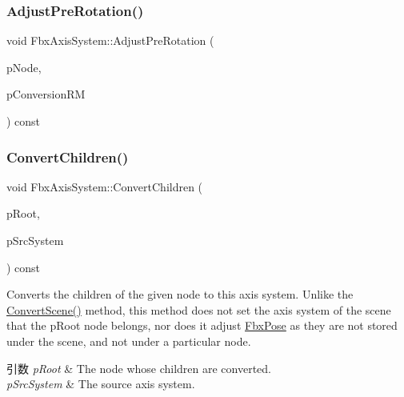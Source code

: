 \mbox{\label{class_fbx_axis_system_af7afdf5273c5ca9130ee8996f6f846a3}} 
\subsubsection{\texorpdfstring{Adjust\+Pre\+Rotation()}{AdjustPreRotation()}}
{\footnotesize\ttfamily void Fbx\+Axis\+System\+::\+Adjust\+Pre\+Rotation (\begin{DoxyParamCaption}\item[{\hyperlink{class_fbx_node}{Fbx\+Node} $\ast$}]{p\+Node,  }\item[{const \hyperlink{class_fbx_matrix}{Fbx\+Matrix} \&}]{p\+Conversion\+RM }\end{DoxyParamCaption}) const\hspace{0.3cm}{\ttfamily [protected]}}

\mbox{\label{class_fbx_axis_system_a3eff3d4a3b2270a5f3675f32b698e6e9}} 
\subsubsection{\texorpdfstring{Convert\+Children()}{ConvertChildren()}\hspace{0.1cm}{\footnotesize\ttfamily [1/2]}}
{\footnotesize\ttfamily void Fbx\+Axis\+System\+::\+Convert\+Children (\begin{DoxyParamCaption}\item[{\hyperlink{class_fbx_node}{Fbx\+Node} $\ast$}]{p\+Root,  }\item[{const \hyperlink{class_fbx_axis_system}{Fbx\+Axis\+System} \&}]{p\+Src\+System }\end{DoxyParamCaption}) const}

Converts the children of the given node to this axis system. Unlike the \hyperlink{class_fbx_axis_system_abb9a361cd8d245c60e68b05868c67b4e}{Convert\+Scene()} method, this method does not set the axis system of the scene that the p\+Root node belongs, nor does it adjust \hyperlink{class_fbx_pose}{Fbx\+Pose} as they are not stored under the scene, and not under a particular node. 
\begin{DoxyParams}{引数}
{\em p\+Root} & The node whose children are converted. \\
\hline
{\em p\+Src\+System} & The source axis system. \\
\hline
\end{DoxyParams}
\mbox{\label{class_fbx_axis_system_aca4f4de94c2d604fa55c001c25c0c227}} 
